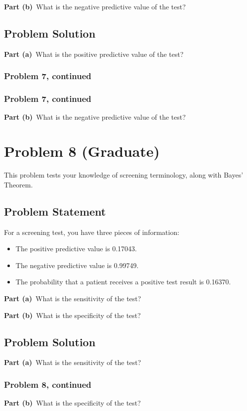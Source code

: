 \documentclass[12pt]{article}
\theoremstyle{definition}
\begin{document}
\bigskip
\noindent
{\bf Part (b)}\ What is the negative predictive value of the test?

\subsection*{Problem Solution}

\bigskip
\noindent
{\bf Part (a)}\ What is the positive predictive value of the test?


\newpage
\subsubsection*{Problem 7, continued}

\newpage
\subsubsection*{Problem 7, continued}

\noindent
{\bf Part (b)}\ What is the negative predictive value of the test?

\newpage
\section*{Problem 8 (Graduate)}

This problem tests your knowledge of screening terminology, along with Bayes' Theorem.

\subsection*{Problem Statement}

For a screening test, you have three pieces of information:
\begin{itemize}
	\item The positive predictive value is 0.17043.
	\item The negative predictive value is 0.99749.
	\item The probability that a patient receives a positive test result is 0.16370.
\end{itemize}

\bigskip
\noindent
{\bf Part (a)}\ What is the sensitivity of the test?

\bigskip
\noindent
{\bf Part (b)}\ What is the specificity of the test?


\subsection*{Problem Solution}

\noindent
{\bf Part (a)}\ What is the sensitivity of the test?



\newpage
\subsubsection*{Problem 8, continued}

\vspace{2in}
\noindent
{\bf Part (b)}\ What is the specificity of the test?
\end{document}
